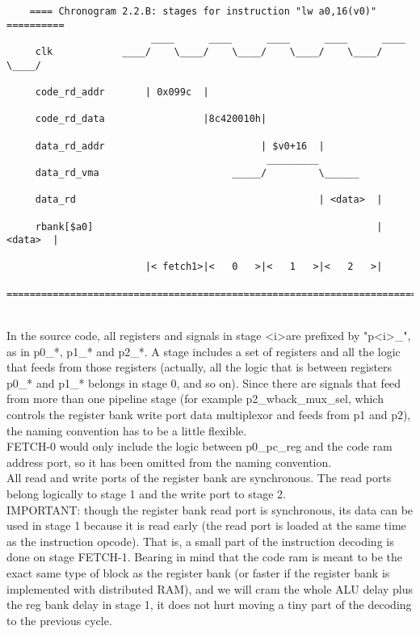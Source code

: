 \documentclass[11pt]{article}
\begin{document}
\begin{verbatim}
    ==== Chronogram 2.2.B: stages for instruction "lw a0,16(v0)" ==========
                         ____      ____      ____      ____      ____
     clk            ____/    \____/    \____/    \____/    \____/    \____/

     code_rd_addr       | 0x099c  |                                        
     
     code_rd_data                 |8c420010h|
     
     data_rd_addr                           | $v0+16  |
                                             _________
     data_rd_vma                       _____/         \______
     
     data_rd                                          | <data>  |

     rbank[$a0]                                                 | <data>  |
     
                        |< fetch1>|<   0   >|<   1   >|<   2   >|
    ========================================================================
\end{verbatim}\\

    In the source code, all registers and signals in stage \textless i\textgreater are prefixed by 
    "p\textless i\textgreater\_", as in p0\_*, p1\_* and p2\_*. A stage includes a set of registers and 
    all the logic that feeds from those registers (actually, all the logic
    that is between registers p0\_* and p1\_* belongs in stage 0, and so on).
    Since there are signals that feed from more than one pipeline stage (for
    example p2\_wback\_mux\_sel, which controls the register bank write port data 
    multiplexor and feeds from p1 and p2), the naming convention has to be
    a little flexible.\\
    
    FETCH-0 would only include the logic between p0\_pc\_reg and the code ram 
    address port, so it has been omitted from the naming convention.\\
    
    All read and write ports of the register bank are synchronous. The read 
    ports belong logically to stage 1 and the write port to stage 2.\\
    
    IMPORTANT: though the register bank read port is synchronous, its data can
    be used in stage 1 because it is read early (the read port is loaded at the 
    same time as the instruction opcode). That is, a small part of the 
    instruction decoding is done on stage FETCH-1. Bearing in mind that the code 
    ram is meant to be the exact same type of block as the register bank (or 
    faster if the register bank is implemented with distributed RAM), and we 
    will cram the whole ALU delay plus the reg bank delay in stage 1, it does 
    not hurt moving a tiny part of the decoding to the previous cycle.\\
    
\end{document}

